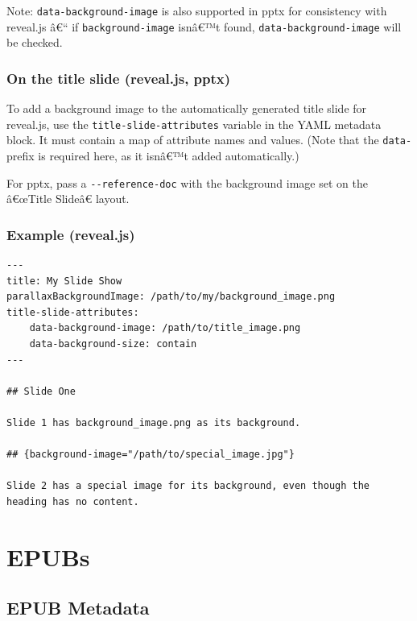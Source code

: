 \documentclass[
]{article}
\begin{document}
Note: \texttt{data-background-image} is also supported in pptx for
consistency with reveal.js â€`` if \texttt{background-image} isnâ€™t
found, \texttt{data-background-image} will be checked.

\hypertarget{on-the-title-slide-reveal.js-pptx}{%
\subsubsection{On the title slide (reveal.js,
pptx)}\label{on-the-title-slide-reveal.js-pptx}}

To add a background image to the automatically generated title slide for
reveal.js, use the \texttt{title-slide-attributes} variable in the YAML
metadata block. It must contain a map of attribute names and values.
(Note that the \texttt{data-} prefix is required here, as it isnâ€™t
added automatically.)

For pptx, pass a \texttt{-\/-reference-doc} with the background image
set on the â€œTitle Slideâ€ layout.

\hypertarget{example-reveal.js}{%
\subsubsection{Example (reveal.js)}\label{example-reveal.js}}

\begin{verbatim}
---
title: My Slide Show
parallaxBackgroundImage: /path/to/my/background_image.png
title-slide-attributes:
    data-background-image: /path/to/title_image.png
    data-background-size: contain
---

## Slide One

Slide 1 has background_image.png as its background.

## {background-image="/path/to/special_image.jpg"}

Slide 2 has a special image for its background, even though the heading has no content.
\end{verbatim}

\hypertarget{epubs}{%
\section{EPUBs}\label{epubs}}

\hypertarget{epub-metadata}{%
\subsection{EPUB Metadata}\label{epub-metadata}}
\end{document}
